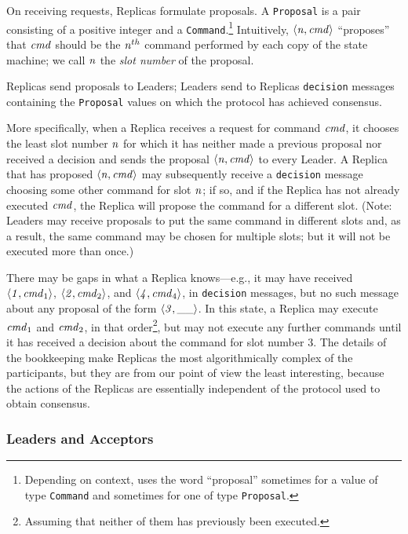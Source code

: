 \documentclass[final]{article}
\begin{document}
On receiving requests, Replicas formulate proposals.  A
\lstinline{Proposal} is a pair consisting of a positive integer and a
\lstinline{Command}.\footnote{Depending on context,
  \cite{VanRenesse:2011} uses the word ``proposal'' sometimes for a value
  of type \lstinline{Command} and sometimes for one of type
  \lstinline{Proposal}.} Intuitively,
$\langle\mathit{n},\mathit{cmd}\rangle$ ``proposes'' that $\mathit{cmd}$
should be the $\mathit{n}^{th}$ command performed by each copy of the
state machine; we call $\mathit{n}$ the \emph{slot number} of the
proposal.

Replicas send proposals to Leaders; Leaders send to Replicas
\lstinline{decision} messages containing the \lstinline{Proposal}
values on which the protocol has achieved consensus.

More specifically, when a Replica receives a request for command
$\mathit{cmd}$, it chooses the least slot number $\mathit{n}$ for which
it has neither made a previous proposal nor received a decision and
sends the proposal $\langle\mathit{n},\mathit{cmd}\rangle$ to every
Leader.  A Replica that has proposed
$\langle\mathit{n},\mathit{cmd}\rangle$ may subsequently receive a
\lstinline{decision} message choosing some other command for slot
$\mathit{n}$; if so, and if the Replica has not already executed
$\mathit{cmd}$, the Replica will propose the command for a different
slot.  (Note: Leaders may receive proposals to put the same command in
different slots and, as a result, the same command may be chosen for
multiple slots; but it will not be executed more than once.)

There may be gaps in what a Replica knows---e.g., it may have received
$\langle\mathit{1},\mathit{cmd}_1\rangle$,
$\langle\mathit{2},\mathit{cmd}_2\rangle$, and
$\langle\mathit{4},\mathit{cmd}_4\rangle$, in \lstinline{decision}
messages, but no such message about any proposal of the form
$\langle\mathit{3},\_\_\rangle$.  In this state, a Replica may execute
${\mathit{cmd}_1}$ and ${\mathit{cmd}_2}$, in that
order\footnote{Assuming that neither of them has previously been
  executed.}, but may not execute any further commands until it has
received a decision about the command for slot number 3.  The details
of the bookkeeping make Replicas the most algorithmically complex of
the participants, but they are from our point of view the least
interesting, because the actions of the Replicas are essentially
independent of the protocol used to obtain consensus.

\subsubsection{Leaders and Acceptors}\label{sec:Leaders-Acceptors}
\end{document}
